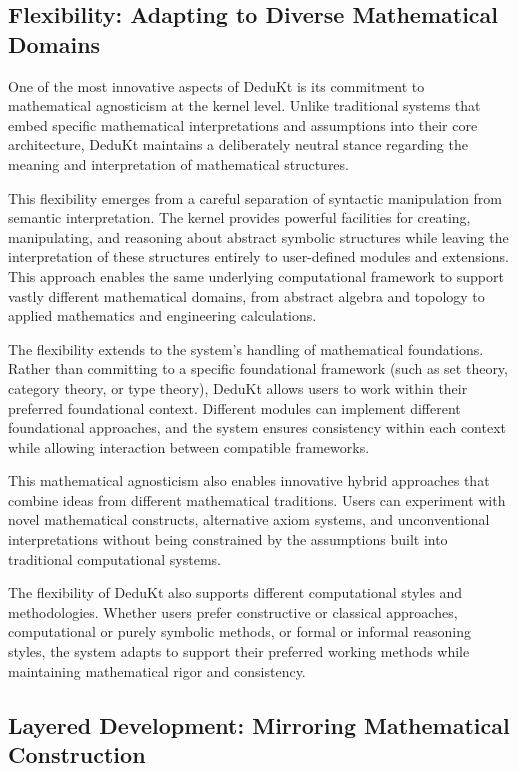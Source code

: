 \subsection{Flexibility: Adapting to Diverse Mathematical Domains}\label{subsec:flexibility:-adapting-to-diverse-mathematical-domains}

One of the most innovative aspects of DeduKt is its commitment to mathematical agnosticism at the kernel level.
Unlike traditional systems that embed specific mathematical interpretations and assumptions into their core architecture, DeduKt maintains a deliberately neutral stance regarding the meaning and interpretation of mathematical structures.

This flexibility emerges from a careful separation of syntactic manipulation from semantic interpretation.
The kernel provides powerful facilities for creating, manipulating, and reasoning about abstract symbolic structures while leaving the interpretation of these structures entirely to user-defined modules and extensions.
This approach enables the same underlying computational framework to support vastly different mathematical domains, from abstract algebra and topology to applied mathematics and engineering calculations.

The flexibility extends to the system's handling of mathematical foundations.
Rather than committing to a specific foundational framework (such as set theory, category theory, or type theory), DeduKt allows users to work within their preferred foundational context.
Different modules can implement different foundational approaches, and the system ensures consistency within each context while allowing interaction between compatible frameworks.

This mathematical agnosticism also enables innovative hybrid approaches that combine ideas from different mathematical traditions.
Users can experiment with novel mathematical constructs, alternative axiom systems, and unconventional interpretations without being constrained by the assumptions built into traditional computational systems.

The flexibility of DeduKt also supports different computational styles and methodologies.
Whether users prefer constructive or classical approaches, computational or purely symbolic methods, or formal or informal reasoning styles, the system adapts to support their preferred working methods while maintaining mathematical rigor and consistency.

\subsection{Layered Development: Mirroring Mathematical Construction}\label{subsec:layered-development:-mirroring-mathematical-construction}


